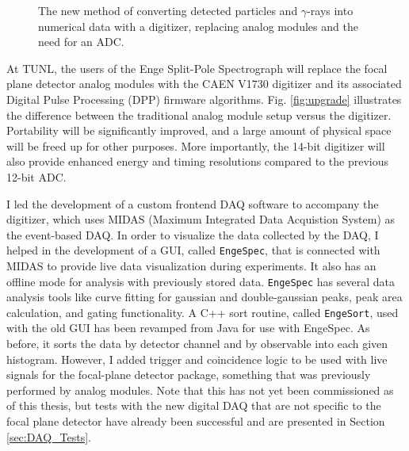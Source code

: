\begin{figure}[t]
\begin{tikzpicture}[scale=1.25, every node/.style={transform shape}]
\end{tikzpicture}
\caption{\label{fig:new_electronics}The new method of converting detected particles and $\gamma$-rays into numerical data with a digitizer, replacing analog modules and the need for an ADC.}
\end{figure}

At TUNL, the users of the Enge Split-Pole Spectrograph will replace the focal plane detector analog modules with the CAEN V1730 digitizer and its associated Digital Pulse Processing (DPP) firmware algorithms. Fig. \ref{fig:upgrade} illustrates the difference between the traditional analog module setup versus the digitizer. Portability will be significantly improved, and a large amount of physical space will be freed up for other purposes. More importantly, the 14-bit digitizer will also provide enhanced energy and timing resolutions compared to the previous 12-bit ADC.

I led the development of a custom frontend DAQ software to accompany the digitizer, which uses MIDAS (Maximum Integrated Data Acquistion System) as the event-based DAQ. 
In order to visualize the data collected by the DAQ, I helped in the development of a GUI, called \texttt{EngeSpec}, that is connected with MIDAS to provide live data visualization during experiments. It also has an offline mode for analysis with previously stored data. \texttt{EngeSpec} has several data analysis tools like curve fitting for gaussian and double-gaussian peaks, peak area calculation, and gating functionality. A C++ sort routine, called \texttt{EngeSort}, used with the old GUI has been revamped from Java for use with EngeSpec. As before, it sorts the data by detector channel and by observable into each given histogram. However, I added trigger and coincidence logic to be used with live signals for the focal-plane detector package, something that was previously performed by analog modules. Note that this has not yet been commissioned as of this thesis, but tests with the new digital DAQ that are not specific to the focal plane detector have already been successful and are presented in Section \ref{sec:DAQ_Tests}.



